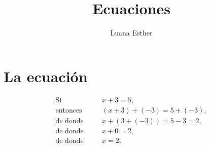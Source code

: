 \documentclass{article}
\title{Ecuaciones}
\author{Luana Esther }
\begin{document}
\maketitle

\section*{La ecuación}

\begin{align*}
    \text{Si} \quad && x + 3 = 5, \\
    \text{entonces} \quad && (x + 3) + (-3) = 5 + (-3), \\
    \text{de donde} \quad && x + (3 + (-3)) = 5 - 3 = 2, \\
    \text{de donde} \quad && x + 0 = 2, \\
    \text{de donde} \quad && x = 2.
\end{align*}
\end{document}
